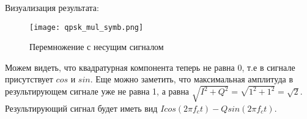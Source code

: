 Визуализация результата:

\begin{figure}[H]
    \centering
    \texttt{[image: qpsk\_mul\_symb.png]}
    \caption{Перемножение с несущим сигналом}
\end{figure}

Можем видеть, что квадратурная компонента теперь не равна 0, т.е в сигнале присутствует $cos$ и $sin$. Еще можно заметить, что
максимальная амплитуда в результирующем сигнале уже не равна 1, а равна $\sqrt{I^2+Q^2} = \sqrt{1^2+1^2} = \sqrt{2}$.
Результирующий сигнал будет иметь вид $Icos(2\pi f_ct) - Qsin(2\pi f_ct)$. 

\endinput
